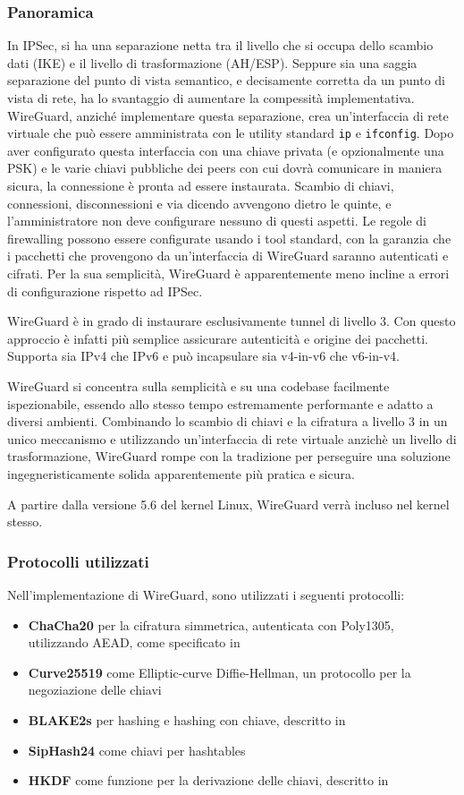 \subsubsection{Panoramica}
In IPSec, si ha una separazione netta tra il livello che si occupa dello scambio dati (IKE) e il livello di trasformazione (AH/ESP). Seppure sia una saggia separazione del punto di vista semantico, e decisamente corretta da un punto di vista di rete, ha lo svantaggio di aumentare la compessità implementativa.
WireGuard, anziché implementare questa separazione, crea un'interfaccia di rete virtuale che può essere amministrata con le utility standard \texttt{ip} e \texttt{ifconfig}. Dopo aver configurato questa interfaccia con una chiave privata (e opzionalmente una PSK) e le varie chiavi pubbliche dei peers con cui dovrà comunicare in maniera sicura, la connessione è pronta ad essere instaurata. Scambio di chiavi, connessioni, disconnessioni e via dicendo avvengono dietro le quinte, e l'amministratore non deve configurare nessuno di questi aspetti.
Le regole di firewalling possono essere configurate usando i tool standard, con la garanzia che i pacchetti che provengono da un'interfaccia di WireGuard saranno autenticati e cifrati. Per la sua semplicità, WireGuard è apparentemente meno incline a errori di configurazione rispetto ad IPSec.

WireGuard è in grado di instaurare esclusivamente tunnel di livello 3. Con questo approccio è infatti più semplice assicurare autenticità e origine dei pacchetti. Supporta sia IPv4 che IPv6 e può incapsulare sia v4-in-v6 che v6-in-v4.

WireGuard si concentra sulla semplicità e su una codebase facilmente ispezionabile, essendo allo stesso tempo estremamente performante e adatto a diversi ambienti. Combinando lo scambio di chiavi e la cifratura a livello 3 in un unico meccanismo e utilizzando un'interfaccia di rete virtuale anzichè un livello di trasformazione, WireGuard rompe con la tradizione per perseguire una soluzione ingegneristicamente solida apparentemente più pratica e sicura.

A partire dalla versione 5.6 del kernel Linux, WireGuard verrà incluso nel kernel stesso.
\subsubsection{Protocolli utilizzati}
Nell'implementazione di WireGuard, sono utilizzati i seguenti protocolli:
\begin{itemize}
    \item \textbf{ChaCha20} per la cifratura simmetrica, autenticata con Poly1305, utilizzando AEAD, come specificato in \cite[RFC7539]{RFC7539}
    \item \textbf{Curve25519} come Elliptic-curve Diffie-Hellman, un protocollo per la negoziazione delle chiavi
    \item \textbf{BLAKE2s} per hashing e hashing con chiave, descritto in \cite[RFC7693]{RFC7693}
    \item \textbf{SipHash24} come chiavi per hashtables
    \item \textbf{HKDF} come funzione per la derivazione delle chiavi, descritto in \cite[RFC5869]{RFC5869}
\end{itemize}


